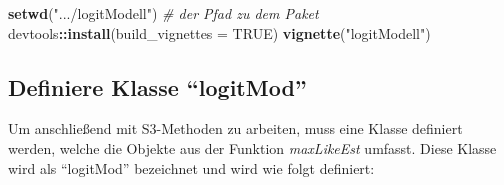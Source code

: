 \documentclass[12pt,]{article}
\newenvironment{Shaded}{\begin{snugshade}}{\end{snugshade}}
\newcommand{\KeywordTok}[1]{\textcolor[rgb]{0.13,0.29,0.53}{\textbf{#1}}}
\newcommand{\DataTypeTok}[1]{\textcolor[rgb]{0.13,0.29,0.53}{#1}}
\newcommand{\StringTok}[1]{\textcolor[rgb]{0.31,0.60,0.02}{#1}}
\newcommand{\CommentTok}[1]{\textcolor[rgb]{0.56,0.35,0.01}{\textit{#1}}}
\newcommand{\OtherTok}[1]{\textcolor[rgb]{0.56,0.35,0.01}{#1}}
\newcommand{\OperatorTok}[1]{\textcolor[rgb]{0.81,0.36,0.00}{\textbf{#1}}}
\newcommand{\NormalTok}[1]{#1}
\begin{document}
\begin{Shaded}
\begin{Highlighting}[]
\KeywordTok{setwd}\NormalTok{(}\StringTok{".../logitModell"}\NormalTok{) }\CommentTok{# der Pfad zu dem Paket}
\NormalTok{devtools}\OperatorTok{::}\KeywordTok{install}\NormalTok{(}\DataTypeTok{build_vignettes =} \OtherTok{TRUE}\NormalTok{)}
\KeywordTok{vignette}\NormalTok{(}\StringTok{"logitModell"}\NormalTok{)}
\end{Highlighting}
\end{Shaded}

\subsection{\texorpdfstring{Definiere Klasse
``logitMod''}{Definiere Klasse logitMod}}\label{definiere-klasse-logitmod}

Um anschließend mit S3-Methoden zu arbeiten, muss eine Klasse definiert
werden, welche die Objekte aus der Funktion \emph{maxLikeEst} umfasst.
Diese Klasse wird als ``logitMod'' bezeichnet und wird wie folgt
definiert:
\end{document}
